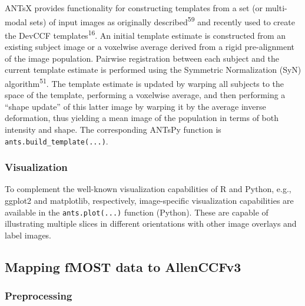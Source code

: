 \documentclass[
  12pt,
]{article}
\begin{document}
ANTsX provides functionality for constructing templates from a set (or
multi-modal sets) of input images as originally
described\textsuperscript{59} and recently used to create the DevCCF
templates\textsuperscript{16}. An initial template estimate is
constructed from an existing subject image or a voxelwise average
derived from a rigid pre-alignment of the image population. Pairwise
registration between each subject and the current template estimate is
performed using the Symmetric Normalization (SyN)
algorithm\textsuperscript{51}. The template estimate is updated by
warping all subjects to the space of the template, performing a
voxelwise average, and then performing a ``shape update'' of this latter
image by warping it by the average inverse deformation, thus yielding a
mean image of the population in terms of both intensity and shape. The
corresponding ANTsPy function is \texttt{ants.build\_template(...)}.

\subsubsection{Visualization}\label{visualization}

To complement the well-known visualization capabilities of R and Python,
e.g., ggplot2 and matplotlib, respectively, image-specific visualization
capabilities are available in the \texttt{ants.plot(...)} function
(Python). These are capable of illustrating multiple slices in different
orientations with other image overlays and label images.

\subsection{Mapping fMOST data to
AllenCCFv3}\label{mapping-fmost-data-to-allenccfv3}

\subsubsection{Preprocessing}\label{preprocessing}
\end{document}
